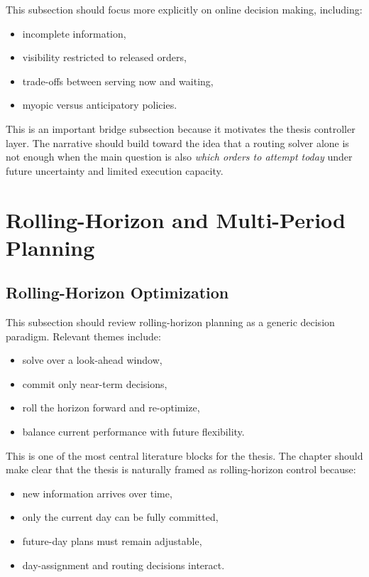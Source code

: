 This subsection should focus more explicitly on online decision making, including:

\begin{itemize}
    \item incomplete information,
    \item visibility restricted to released orders,
    \item trade-offs between serving now and waiting,
    \item myopic versus anticipatory policies.
\end{itemize}

This is an important bridge subsection because it motivates the thesis controller layer. The narrative should build toward the idea that a routing solver alone is not enough when the main question is also \emph{which orders to attempt today} under future uncertainty and limited execution capacity.

\section{Rolling-Horizon and Multi-Period Planning}

\subsection{Rolling-Horizon Optimization}

This subsection should review rolling-horizon planning as a generic decision paradigm. Relevant themes include:

\begin{itemize}
    \item solve over a look-ahead window,
    \item commit only near-term decisions,
    \item roll the horizon forward and re-optimize,
    \item balance current performance with future flexibility.
\end{itemize}

This is one of the most central literature blocks for the thesis. The chapter should make clear that the thesis is naturally framed as rolling-horizon control because:

\begin{itemize}
    \item new information arrives over time,
    \item only the current day can be fully committed,
    \item future-day plans must remain adjustable,
    \item day-assignment and routing decisions interact.
\end{itemize}

